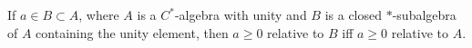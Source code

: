 If $a \in B \subset A$, where $A$ is a $C^*$-algebra with unity and $B$ is a closed $*$-subalgebra of $A$ containing the unity element, then $a \geq 0$ relative to $B$ iff $a \geq 0$ relative to $A$.
